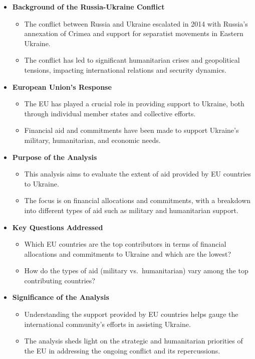 \documentclass[12pt,preprint, authoryear]{elsarticle}
\numberwithin{equation}{section}
\numberwithin{figure}{section}
\numberwithin{table}{section}
\def\tightlist{} %
\begin{document}
\begin{itemize}
\tightlist
\item
  \textbf{Background of the Russia-Ukraine Conflict}

  \begin{itemize}
  \tightlist
  \item
    The conflict between Russia and Ukraine escalated in 2014 with
    Russia's annexation of Crimea and support for separatist movements
    in Eastern Ukraine.
  \item
    The conflict has led to significant humanitarian crises and
    geopolitical tensions, impacting international relations and
    security dynamics.
  \end{itemize}
\item
  \textbf{European Union's Response}

  \begin{itemize}
  \tightlist
  \item
    The EU has played a crucial role in providing support to Ukraine,
    both through individual member states and collective efforts.
  \item
    Financial aid and commitments have been made to support Ukraine's
    military, humanitarian, and economic needs.
  \end{itemize}
\item
  \textbf{Purpose of the Analysis}

  \begin{itemize}
  \tightlist
  \item
    This analysis aims to evaluate the extent of aid provided by EU
    countries to Ukraine.
  \item
    The focus is on financial allocations and commitments, with a
    breakdown into different types of aid such as military and
    humanitarian support.
  \end{itemize}
\item
  \textbf{Key Questions Addressed}

  \begin{itemize}
  \tightlist
  \item
    Which EU countries are the top contributors in terms of financial
    allocations and commitments to Ukraine and which are the lowest?
  \item
    How do the types of aid (military vs.~humanitarian) vary among the
    top contributing countries?
  \end{itemize}
\item
  \textbf{Significance of the Analysis}

  \begin{itemize}
  \tightlist
  \item
    Understanding the support provided by EU countries helps gauge the
    international community's efforts in assisting Ukraine.
  \item
    The analysis sheds light on the strategic and humanitarian
    priorities of the EU in addressing the ongoing conflict and its
    repercussions.
  \end{itemize}
\end{itemize}
\end{document}
